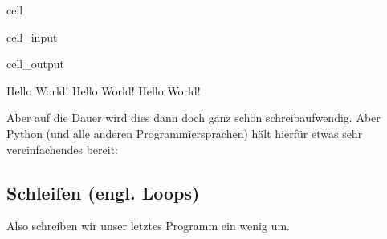 \documentclass[letterpaper,10pt,english]{jupyterBook}
\begin{document}
\begin{sphinxuseclass}{cell}\begin{sphinxVerbatimInput}

\begin{sphinxuseclass}{cell_input}
\begin{sphinxVerbatim}[commandchars=\\\{\}]
 

\end{sphinxVerbatim}

\end{sphinxuseclass}\end{sphinxVerbatimInput}
\begin{sphinxVerbatimOutput}

\begin{sphinxuseclass}{cell_output}
\begin{sphinxVerbatim}[commandchars=\\\{\}]
Hello World!
Hello World!
Hello World!
\end{sphinxVerbatim}

\end{sphinxuseclass}\end{sphinxVerbatimOutput}

\end{sphinxuseclass}
\sphinxAtStartPar
Aber auf die Dauer wird dies dann doch ganz schön schreibaufwendig. Aber Python (und alle anderen Programmiersprachen) hält hierfür etwas sehr vereinfachendes bereit: 


\subsection{Schleifen (engl. Loops)}
\label{\detokenize{Notebooks/Hello World!:schleifen-engl-loops}}
\sphinxAtStartPar
Also schreiben wir unser letztes Programm ein wenig um.
\end{document}
